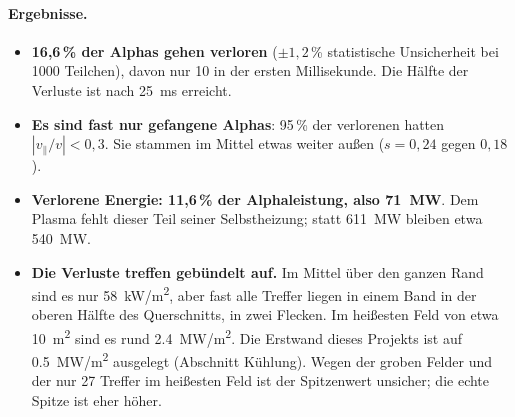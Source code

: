 
\paragraph{Ergebnisse.}
\begin{itemize}\itemsep1pt
\item \textbf{16,6\,\% der Alphas gehen verloren} ($\pm1{,}2$\,\% statistische Unsicherheit bei 1000 Teilchen),
  davon nur 10 in der ersten Millisekunde. Die Hälfte der Verluste ist nach \SI{25}{ms} erreicht.
\item \textbf{Es sind fast nur gefangene Alphas}: 95\,\% der verlorenen hatten $|v_\parallel/v| < 0{,}3$. Sie stammen
  im Mittel etwas weiter außen ($s = 0{,}24$ gegen $0{,}18$).
\item \textbf{Verlorene Energie: 11,6\,\% der Alphaleistung, also \SI{71}{MW}}. Dem Plasma fehlt dieser Teil seiner
  Selbstheizung; statt \SI{611}{MW} bleiben etwa \SI{540}{MW}.
\item \textbf{Die Verluste treffen gebündelt auf.} Im Mittel über den ganzen Rand sind es nur \SI{58}{kW/m^2}, aber
  fast alle Treffer liegen in einem Band in der oberen Hälfte des Querschnitts, in zwei Flecken. Im heißesten Feld
  von etwa \SI{10}{m^2} sind es rund \SI{2,4}{MW/m^2}. Die Erstwand dieses Projekts ist auf \SI{0,5}{MW/m^2}
  ausgelegt (Abschnitt Kühlung). Wegen der groben Felder und der nur 27 Treffer im heißesten Feld ist der Spitzenwert
  unsicher; die echte Spitze ist eher höher.
\end{itemize}

